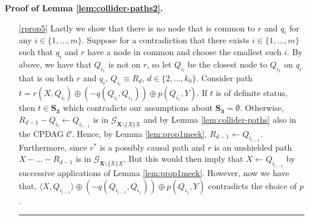 \documentclass[11pt]{article}
\DeclareMathOperator{\Adj}{Adj}
\newcommand{\BlackBox}{\rule{1.5ex}{1.5ex}}  %
\newcommand{\mb}[1]{\mathbf{#1}}
\newcommand{\g}[1][G]{\mathcal{#1}}
\newenvironment{proofofnoqed}[1][]{\noindent \textbf{Proof of #1.}}{}
\begin{document}
\begin{proofofnoqed}[Lemma \ref{lem:collider-paths2}]
\begin{itemize}
        Otherwise, $t$ is not of definite status due to $P_u$, and $R_{l-1} - P_u - P_{u+1}$ or $R_{l-1} - P_u \gets P_{u+1}$ and $\langle R_{l-1}, P_u \rangle$ is in $\g_{\overline{\mb{X} \setminus \{X\}} \underline{X}}.$ Let $P_{d}$, $d \in \{u+1, \dots, k\}$ be chosen so that $P_{d+1}$ is the closest collider to $P_u$ on $p(P_u, Y)$ or if there is no collider on $p(P_u, Y)$, then let, $P_d = Y$. Consider that none of the nodes among $P_{u+1}, \dots , P_d$ are adjacent to $X$ as that would imply that $X - P_h$ or $X \gets P_h$, for $h \in \{u+1, \dots, d \}$ is in $ \g_{\overline{\mb{X} \setminus \{X\}} \underline{X}}$ and neither of that is possible (the former due to Lemma \ref{lem:unishielded-colliders}, and the latter due to the choice of $p$, as $\langle X, P_h \rangle \oplus p(P_h, Y)$ has all the same properties as $p$ but is shorter). 

        Hence, choose as $P_h$ $h \in \{u+1, \dots, d \}$ a node with the largest index that is adjacent to a node on $r(X,R_{l-1})$. Next, choose as $R_o$, $o \in \{1, \dots, l-1\}$ a node with the smallest index such that $R_o \in \Adj(P_h,\g_{\overline{\mb{X} \setminus \{X\}} \underline{X}})$. Then consider path $t = r(X,R_{o}) \langle R_{o}, P_{h} \rangle \oplus p(P_{h} ,Y)$. Path $t$ has the same properties as $p$ but starts with an undirected edge, which contradicts that $\mb{S_3} = \emptyset$.

        \item[\ref{rprop5}] Lastly we show that there is no node that is common to $r$ and $q_i$ for any $i \in \{1, \dots, m\}$. Suppose for a contradiction that there exists $i \in \{1, \dots , m\}$ such that $q_i$ and $r$ have a node in common and choose the smallest such $i$. By above, we have that $Q_{i_1}$ is not on $r$, so let $Q_{i_l}$ be the closest node to $Q_{i_1}$ on $q_i$ that is on both $r$ and $q_i$, $Q_{i_l} \equiv R_d$, $d \in \{2, \dots, k_0\}$. Consider path $t = r(X,Q_{i_l}) \oplus (-q(Q_{i_l}, Q_{i_1})) \oplus p(Q_{i_1}, Y)$. If $t$ is of definite status, then $t \in \mb{S_3}$ which contradicts our assumptions about $\mb{S_3} = \emptyset$. Otherwise, $R_{d-1} - Q_{i_l} \gets Q_{i_{l-1}}$ is in $\g_{\overline{\mb{X} \setminus \{X\}} \underline{X}}$ and by Lemma \ref{lem:collider-paths} also in the CPDAG $\g[C]$. Hence, by Lemma \ref{lem:prop1meek}, $R_{d-1} \gets Q_{i_{l-1}}$. Furthermore, since $r^{*}$ is a possibly causal path and $r$ is an unshielded path $X - \dots - R_{d-1}$ is in $\g_{\overline{\mb{X} \setminus \{X\}} \underline{X}}$. But this would then imply that $X \gets Q_{i_{l-1}}$ by successive applications of Lemma \ref{lem:prop1meek}. However, now we have that, $\langle X, Q_{i_{l-1}} \rangle \oplus (-q(Q_{i_{l-1}}, Q_{i_1})) \oplus p(Q_{i_1}, Y)$ contradicts the choice of $p$. \hfill \BlackBox
    \end{itemize}
\end{proofofnoqed}
\end{document}

